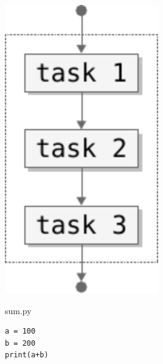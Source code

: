 \documentclass[aspectratio=1610,t]{beamer}
\begin{document}
\begin{pframe}
 \begin{minipage}{0.37\textwidth}
 \begin{center}
   \includegraphics[width=0.50\textwidth]{../../images/flow_sequential.pdf}
 \end{center}
 \end{minipage}%
 \begin{minipage}{0.57\textwidth}
 \begin{pythonfile}{sum.py}
  \begin{verbatim}
a = 100
b = 200
print(a+b)
  \end{verbatim}
 \end{pythonfile}
 \begin{terminal}
 \end{terminal}
 \end{minipage}
\end{pframe}
\end{document}
